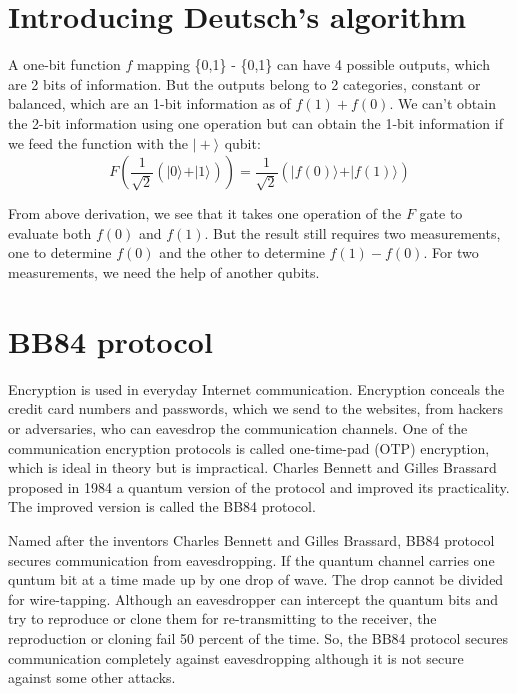 \documentclass{book}
\newcommand{\keta}[2][]{\vert {#2} \rangle_{#1}}
\begin{document}
\section{Introducing Deutsch's algorithm}
A one-bit function $f$ mapping \{0,1\} -\> \{0,1\} can have 4 possible outputs, which are 2 bits of information. But the outputs belong to 2 categories, constant or balanced, which are an 1-bit information as of $f(1)+f(0)$. We can't obtain the 2-bit information using one operation but can obtain the 1-bit information if we feed the function with the $\keta{+}$ qubit:
\begin{equation}\label{DeutschF1}
    F(\frac 1 {\sqrt 2} (\keta{0}+\keta{1}) ) = \frac 1 {\sqrt 2} (\keta{f(0)}+ \keta{f(1)}) 
\end{equation}

From above derivation, we see that it takes one operation of the $F$ gate to evaluate both $f(0)$ and $f(1)$. But the result still requires two measurements, one to determine $f(0)$ and the other to determine $f(1)-f(0)$. For two measurements, we need the help of another qubits.

\section{BB84 protocol}
Encryption is used in everyday Internet communication. Encryption conceals the credit card numbers and passwords, which we send to the websites, from hackers or adversaries, who can eavesdrop the communication channels. One of the communication encryption protocols is called one-time-pad (OTP) encryption, which is ideal in theory but is impractical. Charles Bennett and Gilles Brassard proposed in 1984 a quantum version of the protocol and improved its practicality. The improved version is called the BB84 protocol\cite{BB84}.

Named after the inventors Charles Bennett and Gilles Brassard, BB84 protocol secures communication from eavesdropping. If the quantum channel carries one quntum bit at a time made up by one drop of wave. The drop cannot be divided for wire-tapping. Although an eavesdropper can intercept the quantum bits and try to reproduce or clone them for re-transmitting to the receiver, the reproduction or cloning fail 50 percent of the time. So, the BB84 protocol secures communication completely against eavesdropping although it is not secure against some other attacks.
\end{document}
